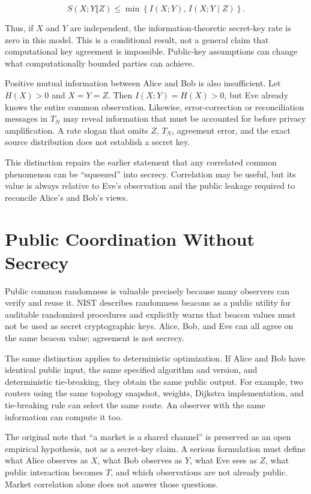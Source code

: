 \[
    S(X;Y\mathbin\Vert Z)
    \leq \min\!\left\{I(X;Y),\,I(X;Y\mid Z)\right\}.
\]

Thus, if $X$ and $Y$ are independent, the information-theoretic secret-key
rate is zero in this model.  This is a conditional result, not a general claim
that computational key agreement is impossible.  Public-key assumptions can
change what computationally bounded parties can achieve.

Positive mutual information between Alice and Bob is also insufficient.  Let
$H(X)>0$ and $X=Y=Z$.  Then $I(X;Y)=H(X)>0$, but Eve already knows the entire
common observation.  Likewise, error-correction or reconciliation messages in
$T_N$ may reveal
information that must be accounted for before privacy amplification.  A rate
slogan that omits $Z$, $T_N$, agreement error, and the exact source distribution
does not establish a secret key.

This distinction repairs the earlier statement that any correlated common
phenomenon can be ``squeezed'' into secrecy.  Correlation may be useful, but its
value is always relative to Eve's observation and the public leakage required
to reconcile Alice's and Bob's views.

\section{Public Coordination Without Secrecy}

Public common randomness is valuable precisely because many observers can
verify and reuse it.  NIST describes randomness beacons as a public utility for
auditable randomized procedures and explicitly warns that beacon values must
not be used as secret cryptographic keys\cite{nist-randomness-beacons}.  Alice,
Bob, and Eve can all agree on the same beacon value; agreement is not secrecy.

The same distinction applies to deterministic optimization.  If Alice and Bob
have identical public input, the same specified algorithm and version, and
deterministic tie-breaking, they obtain the same public output.  For example,
two routers using the same topology snapshot, weights, Dijkstra implementation,
and tie-breaking rule can select the same route.  An observer with the same
information can compute it too.

The original note that ``a market is a shared channel'' is preserved as an
open empirical hypothesis, not as a secret-key claim.  A serious formulation
must define what Alice observes as $X$, what Bob observes as $Y$, what Eve sees
as $Z$, what public interaction becomes $T$, and which observations are not
already public.  Market correlation alone does not answer those questions.

